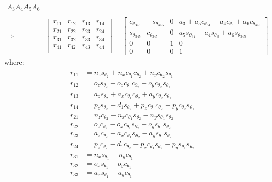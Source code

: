 \documentclass[11pt,a4paper, titlepage]{article}
\begin{document}
\begin{appendices}
\begin{equation*}
\begin{split}
A_3 A_4 A_5 A_6 \\\\
\Rightarrow\,
&\begin{bmatrix}
r_{11} & r_{12} & r_{13} & r_{14} \\
r_{21} & r_{22} & r_{23} & r_{24} \\
r_{31} & r_{32} & r_{33} & r_{34} \\
r_{41} & r_{42} & r_{43} & r_{44} \\
\end{bmatrix} =
\begin{bmatrix}
c_{\theta_{345}} & -s_{\theta_{345}} & 0 & a_3 + a_5c_{\theta_{34}} + a_4c_{\theta_3} + a_6c_{\theta_{345}} \\
s_{\theta_{345}} & c_{\theta_{345}} & 0 & a_5s_{\theta_{34}} + a_4s_{\theta_3} + a_6s_{\theta_{345}} \\
0 & 0 & 1 & 0 \\
0 & 0 & 0 & 1
\end{bmatrix}
\end{split}
\end{equation*}
where: \\
\begin{align*}
\begin{split}
r_{11} &= n_zs_{\theta_2} + n_xc_{\theta_1}c_{\theta_2} + n_yc_{\theta_2}s_{\theta_1} \\
r_{12} &= o_zs_{\theta_2} + o_xc_{\theta_1}c_{\theta_2} + o_yc_{\theta_2}s_{\theta_1} \\
r_{13} &= a_zs_{\theta_2} + a_xc_{\theta_1}c_{\theta_2} + a_yc_{\theta_2}s_{\theta_1} \\
r_{14} &= p_zs_{\theta_2} - d_1s_{\theta_2} + p_xc_{\theta_1}c_{\theta_2} + p_yc_{\theta_2}s_{\theta_1}\\
r_{21} &= n_zc_{\theta_2} - n_xc_{\theta_1}s_{\theta_2} - n_ys_{\theta_1}s_{\theta_2}\\
r_{22} &= o_zc_{\theta_2} - o_xc_{\theta_1}s_{\theta_2} - o_ys_{\theta_1}s_{\theta_2} \\
r_{23} &= a_zc_{\theta_2} - a_xc_{\theta_1}s_{\theta_2} - a_ys_{\theta_1}s_{\theta_2}\\
r_{24} &= p_zc_{\theta_2} - d_1c_{\theta_2} - p_xc_{\theta_1}s_{\theta_2} - p_ys_{\theta_1}s_{\theta_2}\\
r_{31} &= n_xs_{\theta_1} - n_yc_{\theta_1}\\
r_{32} &= o_xs_{\theta_1} - o_yc_{\theta_1}\\
r_{33} &= a_xs_{\theta_1} - a_yc_{\theta_1}\\

\end{split}
\end{align*}
\end{appendices}
\end{document}
